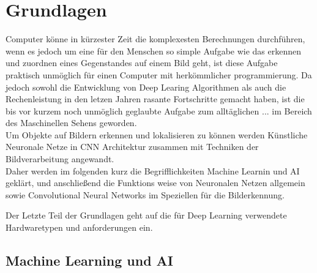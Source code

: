 \chapter{Grundlagen}\label{kap:grundlagen}


Computer könne in kürzester Zeit die komplexesten Berechnungen 
durchführen, wenn es jedoch um eine für den Menschen so 
simple Aufgabe wie das erkennen und zuordnen eines Gegenstandes
auf einem Bild geht, ist diese Aufgabe praktisch 
unmöglich für einen Computer mit herkömmlicher programmierung. 
Da jedoch sowohl die Entwicklung von Deep Learing Algorithmen 
als auch die Rechenleistung in den letzen Jahren rasante 
Fortschritte gemacht haben, ist die bis vor kurzem 
noch unmöglich geglaubte Aufgabe zum alltäglichen ... 
im Bereich des Maschinellen Sehens geworden.\\

Um Objekte auf Bildern erkennen und lokalisieren zu können 
werden Künstliche Neuronale Netze in CNN Architektur 
zusammen mit Techniken der Bildverarbeitung angewandt.\\

Daher werden im folgenden kurz die Begrifflichkeiten Machine 
Learnin und AI geklärt, und anschließend die Funktions
weise von Neuronalen Netzen allgemein sowie Convolutional 
Neural Networks im Speziellen für die Bilderkennung.

Der Letzte Teil der Grundlagen geht auf die für Deep 
Learning verwendete Hardwaretypen und anforderungen ein.






\section{Machine Learning und AI}\label{sec:ml}


